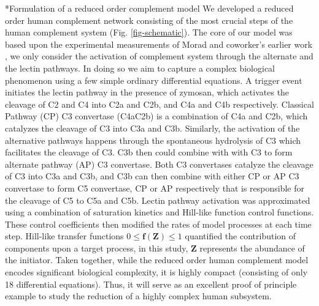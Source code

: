 \documentclass[12pt]{article}
\makeatletter
\renewcommand\subsection{\@startsection
	{subsection}{2}{0mm}
	{-0.05in}
	{-0.5\baselineskip}
	{\normalfont\normalsize\bfseries}}
\makeatother
\begin{document}
\subsection*{Formulation of a reduced order complement model}
We developed a reduced order human complement network consisting of the most crucial steps of the human complement system (Fig. \ref{fig-schematic}). The core of our model was based upon the experimental measurements of Morad and coworker's earlier work \cite{morad2015time}, we only consider the activation of complement system through the alternate and the lectin pathways. In doing so we aim to capture a complex biological phenomenon using a few simple ordinary differential equations.  A trigger event initiates the lectin pathway in the presence of zymosan, which activates the cleavage of C2 and C4 into C2a and C2b, and C4a and C4b respectively. Classical Pathway (CP) C3 convertase (C4aC2b) is a combination of C4a and C2b, which catalyzes the cleavage of C3 into C3a and C3b. Similarly, the activation of the alternative pathways happens through the spontaneous hydrolysis of C3 which facilitates the cleavage of C3. C3b then could combine with with C3 to form alternate pathway (AP) C3 convertase. Both C3 convertases catalyze the cleavage of C3 into C3a and C3b, and C3b can then combine with either CP or AP C3 convertase to form C5 convertase, CP or AP respectively that is responsible for the cleavage of C5 to C5a and C5b. Lectin pathway activation was approximated using a combination of saturation kinetics and Hill-like function control functions. These control coefficients then modified the rates of model processes at each time step. Hill-like transfer functions $0 \le \mathbf{f (Z)}  \le 1$ quantified the contribution of components upon a target process, in this study, $\mathbf{Z}$ represents the abundance of the initiator. Taken together, while the reduced order human complement model encodes significant biological complexity, it is highly compact (consisting of only 18 differential equations). Thus, it will serve as an excellent proof of principle example to study the reduction of a highly complex human subsystem.
\end{document}
